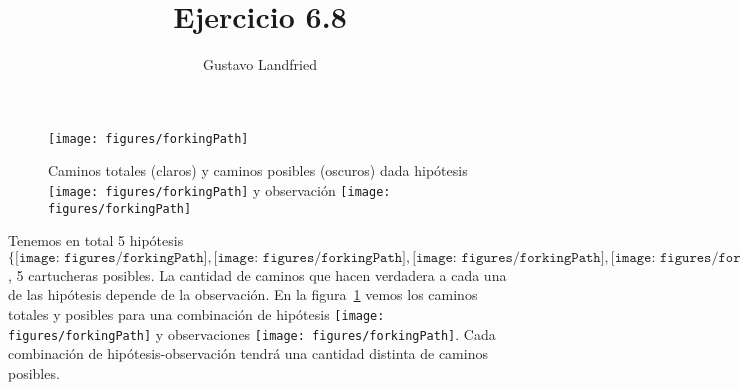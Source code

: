 \documentclass[a4paper,10pt,spanish]{article}
\title{Ejercicio 6.8}
\author{Gustavo Landfried}
\date{}
\begin{document}
\maketitle

 \begin{figure}[H]     
    \centering \small
     \texttt{[image: figures/forkingPath]}
    
    \scriptsize Caminos totales (claros) y caminos posibles (oscuros) dada hip\'otesis \texttt{[image: figures/forkingPath]} y observaci\'on \texttt{[image: figures/forkingPath]}
    \caption{}
    \label{caminos}
\end{figure}

Tenemos en total 5 hip\'otesis $\{ \texttt{[image: figures/forkingPath]},\texttt{[image: figures/forkingPath]},\texttt{[image: figures/forkingPath]},\texttt{[image: figures/forkingPath]},\texttt{[image: figures/forkingPath]} \}$, 5 cartucheras posibles.
La cantidad de caminos que hacen verdadera a cada una de las hip\'otesis depende de la observaci\'on.
En la figura~\ref{caminos} vemos los caminos totales y posibles para una combinaci\'on de hip\'otesis \texttt{[image: figures/forkingPath]} y observaciones \texttt{[image: figures/forkingPath]}.
Cada combinaci\'on de hip\'otesis-observaci\'on tendr\'a una cantidad distinta de caminos posibles.
 
\end{document}
